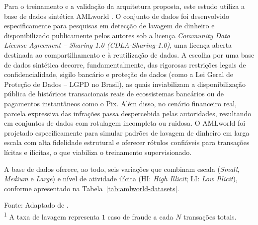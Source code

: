 \documentclass[titlepage,a4paper,oneside,onecolumn,12pt]{report}
\newcommand{\source}[1]{\par\noindent\footnotesize Fonte: #1\par}
\begin{document}
Para o treinamento e a validação da arquitetura proposta, este estudo utiliza a base de dados sintética AMLworld \cite{altman2023realistic}. O conjunto de dados foi desenvolvido especificamente para pesquisas em detecção de lavagem de dinheiro e disponibilizado publicamente pelos autores sob a licença \textit{Community Data License Agreement – Sharing 1.0 (CDLA-Sharing-1.0)}, uma licença aberta destinada ao compartilhamento e à reutilização de dados. A escolha por uma base de dados sintética decorre, fundamentalmente, das rigorosas restrições legais de confidencialidade, sigilo bancário e proteção de dados (como a Lei Geral de Proteção de Dados -- LGPD no Brasil), as quais inviabilizam a disponibilização pública de históricos transacionais reais de ecossistemas bancários ou de pagamentos instantâneos como o Pix. Além disso, no cenário financeiro real, parcela expressiva das infrações passa despercebida pelas autoridades, resultando em conjuntos de dados com rotulagem incompleta ou ruidosa. O AMLworld foi projetado especificamente para simular padrões de lavagem de dinheiro em larga escala com alta fidelidade estrutural e oferecer rótulos confiáveis para transações lícitas e ilícitas, o que viabiliza o treinamento supervisionado.

A base de dados oferece, ao todo, seis variações que combinam escala (\textit{Small},
\textit{Medium} e \textit{Large}) e nível de atividade ilícita (HI: \textit{High Illicit};
LI: \textit{Low Illicit}), conforme apresentado na Tabela~\ref{tab:amlworld-datasets}.

\begin{table}
    \centering
    \caption{Resumo das variações da base de dados AMLworld}
    \label{tab:amlworld-datasets}
    \source{Adaptado de .\\
    \textsuperscript{1} A taxa de lavagem representa $1$ caso de fraude a cada $N$ transações totais.}
\end{table}
\end{document}
